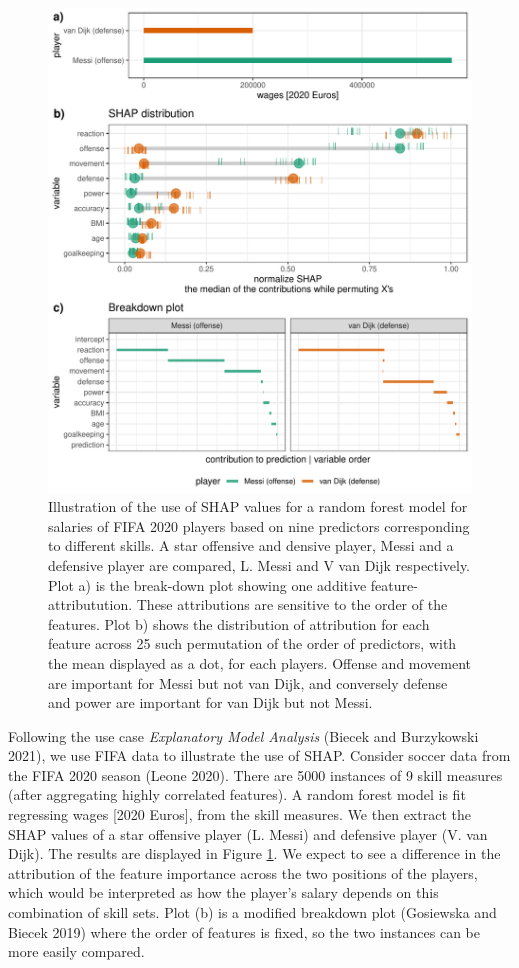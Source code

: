 \documentclass[
]{article}
\begin{document}
\begin{figure}

{\centering \includegraphics[width=0.6\linewidth]{./figures/shap_distr_bd} 

}

\caption{Illustration of the use of SHAP values for a random forest model for salaries of FIFA 2020 players based on nine predictors corresponding to different skills. A star offensive and densive player, Messi and a defensive player are compared, L. Messi and V van Dijk respectively. Plot a) is the break-down plot showing one additive feature-attributution. These attributions are sensitive to the order of the features. Plot b) shows the distribution of attribution for each feature across 25 such permutation of the order of predictors, with the mean displayed as a dot, for each players. Offense and movement are important for Messi but not van Dijk, and conversely defense and power are important for van Dijk but not Messi.}\label{fig:shapdistrbd}
\end{figure}

Following the use case \emph{Explanatory Model Analysis} (Biecek and Burzykowski 2021), we use FIFA data to illustrate the use of SHAP. Consider soccer data from the FIFA 2020 season (Leone 2020). There are 5000 instances of 9 skill measures (after aggregating highly correlated features). A random forest model is fit regressing wages {[}2020 Euros{]}, from the skill measures. We then extract the SHAP values of a star offensive player (L. Messi) and defensive player (V. van Dijk). The results are displayed in Figure \ref{fig:shapdistrbd}. We expect to see a difference in the attribution of the feature importance across the two positions of the players, which would be interpreted as how the player's salary depends on this combination of skill sets. Plot (b) is a modified breakdown plot (Gosiewska and Biecek 2019) where the order of features is fixed, so the two instances can be more easily compared.
\end{document}
